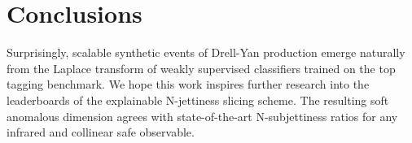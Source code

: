 \section{Conclusions}\label{sec:conclusions}

Surprisingly, scalable synthetic events of Drell-Yan production emerge
naturally from the Laplace transform of weakly supervised classifiers
trained on the top tagging benchmark. We hope this work inspires further
research into the leaderboards of the explainable N-jettiness slicing
scheme. The resulting soft anomalous dimension agrees with
state-of-the-art N-subjettiness ratios for any infrared and collinear
safe observable.


